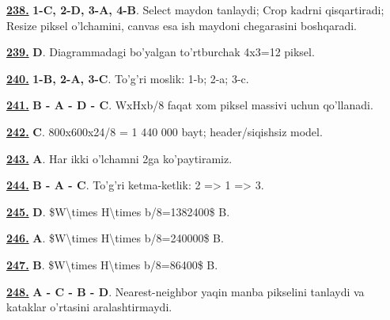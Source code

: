 \documentclass[10pt,a4paper,oneside]{article}
\begin{document}
\noindent\hyperlink{q238}{\textbf{238.}} \textbf{1-C, 2-D, 3-A, 4-B}.  Select maydon tanlaydi; Crop kadrni qisqartiradi; Resize piksel o'lchamini, canvas esa ish maydoni chegarasini boshqaradi.
\par\vspace{3mm}
\noindent\hyperlink{q239}{\textbf{239.}} \textbf{D}.  Diagrammadagi bo'yalgan to'rtburchak 4x3=12 piksel.
\par\vspace{3mm}
\noindent\hyperlink{q240}{\textbf{240.}} \textbf{1-B, 2-A, 3-C}.  To'g'ri moslik: 1-b; 2-a; 3-c.
\par\vspace{3mm}
\noindent\hyperlink{q241}{\textbf{241.}} \textbf{B - A - D - C}.  WxHxb/8 faqat xom piksel massivi uchun qo'llanadi.
\par\vspace{3mm}
\noindent\hyperlink{q242}{\textbf{242.}} \textbf{C}.  800x600x24/8 = 1 440 000 bayt; header/siqishsiz model.
\par\vspace{3mm}
\noindent\hyperlink{q243}{\textbf{243.}} \textbf{A}.  Har ikki o'lchamni 2ga ko'paytiramiz.
\par\vspace{3mm}
\noindent\hyperlink{q244}{\textbf{244.}} \textbf{B - A - C}.  To'g'ri ketma-ketlik: 2 =\textgreater{} 1 =\textgreater{} 3.
\par\vspace{3mm}
\noindent\hyperlink{q245}{\textbf{245.}} \textbf{D}.  \$W\textbackslash{}times H\textbackslash{}times b/8=1382400\$ B.
\par\vspace{3mm}
\noindent\hyperlink{q246}{\textbf{246.}} \textbf{A}.  \$W\textbackslash{}times H\textbackslash{}times b/8=240000\$ B.
\par\vspace{3mm}
\noindent\hyperlink{q247}{\textbf{247.}} \textbf{B}.  \$W\textbackslash{}times H\textbackslash{}times b/8=86400\$ B.
\par\vspace{3mm}
\noindent\hyperlink{q248}{\textbf{248.}} \textbf{A - C - B - D}.  Nearest-neighbor yaqin manba pikselini tanlaydi va kataklar o'rtasini aralashtirmaydi.
\par\vspace{3mm}
\end{document}
